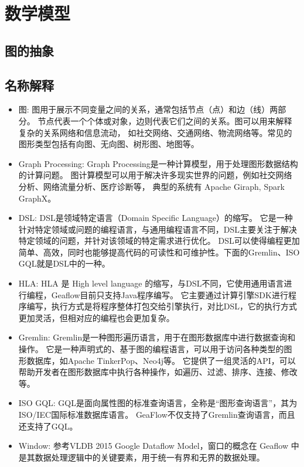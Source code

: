 \section{数学模型}

\subsection{图的抽象}

\subsection{名称解释}
\begin{itemize}
  \item 图: 图用于展示不同变量之间的关系，通常包括节点（点）和边（线）两部分。
    节点代表一个个体或对象，边则代表它们之间的关系。图可以用来解释复杂的关系网络和信息流动，
    如社交网络、交通网络、物流网络等。常见的图形类型包括有向图、无向图、树形图、地图等。
  \item Graph Processing:  Graph Processing是一种计算模型，用于处理图形数据结构的计算问题。
    图计算模型可以用于解决许多现实世界的问题，例如社交网络分析、网络流量分析、医疗诊断等，
    典型的系统有 Apache Giraph, Spark GraphX。
  \item DSL:  DSL是领域特定语言（Domain Specific Language）的缩写。
    它是一种针对特定领域或问题的编程语言，与通用编程语言不同，DSL主要关注于解决特定领域的问题，并针对该领域的特定需求进行优化。
    DSL可以使得编程更加简单、高效，同时也能够提高代码的可读性和可维护性。下面的Gremlin、ISO GQL就是DSL中的一种。
  \item HLA: HLA 是 High level language 的缩写，与DSL不同，它使用通用语言进行编程，Geaflow目前只支持Java程序编写。
    它主要通过计算引擎SDK进行程序编写，执行方式是将程序整体打包交给引擎执行，对比DSL，它的执行方式更加灵活，但相对应的编程也会更加复杂。
  \item Gremlin: Gremlin是一种图形遍历语言，用于在图形数据库中进行数据查询和操作。
    它是一种声明式的、基于图的编程语言，可以用于访问各种类型的图形数据库，如Apache TinkerPop、Neo4j等。
    它提供了一组灵活的API，可以帮助开发者在图形数据库中执行各种操作，如遍历、过滤、排序、连接、修改等。
  \item ISO GQL: GQL是面向属性图的标准查询语言，全称是“图形查询语言”，其为ISO/IEC国际标准数据库语言。
    GeaFlow不仅支持了Gremlin查询语言，而且还支持了GQL。
  \item Window: 参考VLDB 2015 Google Dataflow Model，窗口的概念在 Geaflow 中是其数据处理逻辑中的关键要素，用于统一有界和无界的数据处理。

\end{itemize}
